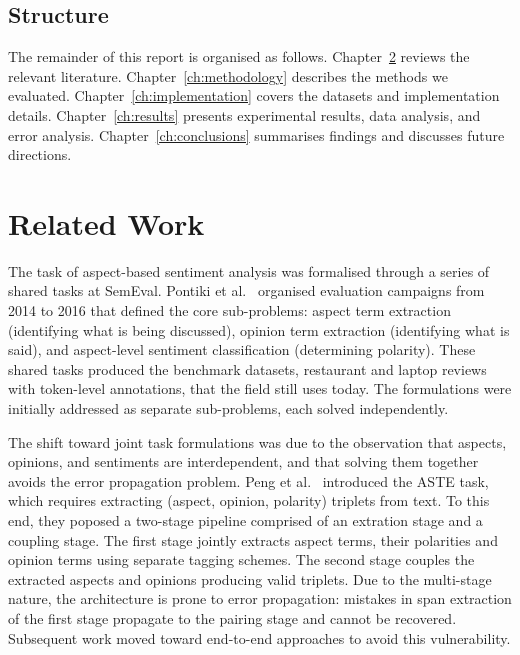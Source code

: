 \documentclass[12pt,a4paper]{report}
\begin{document}
\section{Structure}

The remainder of this report is organised as follows. Chapter~\ref{ch:relatedwork} reviews the relevant literature. Chapter~\ref{ch:methodology} describes the methods we evaluated. Chapter~\ref{ch:implementation} covers the datasets and implementation details. Chapter~\ref{ch:results} presents experimental results, data analysis, and error analysis. Chapter~\ref{ch:conclusions} summarises findings and discusses future directions.



\chapter{Related Work}\label{ch:relatedwork}

The task of aspect-based sentiment analysis was formalised through a series of shared tasks at SemEval. Pontiki et al.~\cite{pontiki2014semeval, pontiki2015semeval, pontiki2016semeval} organised evaluation campaigns from 2014 to 2016 that defined the core sub-problems: aspect term extraction (identifying what is being discussed), opinion term extraction (identifying what is said), and aspect-level sentiment classification (determining polarity). These shared tasks produced the benchmark datasets, restaurant and laptop reviews with token-level annotations, that the field still uses today. The formulations were initially addressed as separate sub-problems, each solved independently.

The shift toward joint task formulations was due to the observation that aspects, opinions, and sentiments are interdependent, 
and that solving them together avoids the error propagation problem. Peng et al.~\cite{peng2020knowing} introduced the ASTE task, 
which requires extracting (aspect, opinion, polarity) triplets from text. To this end, they poposed a two-stage pipeline comprised of an extration stage and a coupling stage.
The first stage jointly extracts aspect terms, their polarities and opinion terms using separate tagging schemes. 
The second stage couples the extracted aspects and opinions producing valid triplets. Due to the multi-stage nature, the architecture is prone to error propagation: 
mistakes in span extraction of the first stage propagate to the pairing stage and cannot be recovered. 
Subsequent work moved toward end-to-end approaches to avoid this vulnerability.
\end{document}
